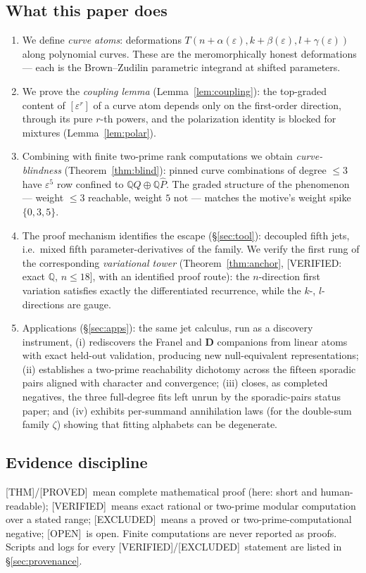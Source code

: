 \documentclass[11pt,reqno]{amsart}
\theoremstyle{plain}
\theoremstyle{definition}
\theoremstyle{remark}
\newcommand{\Q}{\mathbb{Q}}
\newcommand{\Thm}{\textup{\textsf{[THM]}}}
\newcommand{\Proved}{\textup{\textsf{[PROVED]}}}
\newcommand{\Verified}{\textup{\textsf{[VERIFIED]}}}
\newcommand{\VerifiedR}[1]{\textup{\textsf{[VERIFIED: #1]}}}
\newcommand{\Excluded}{\textup{\textsf{[EXCLUDED]}}}
\newcommand{\Open}{\textup{\textsf{[OPEN]}}}
\begin{document}
\subsection{What this paper does}
\begin{enumerate}[leftmargin=2em]
\item We define \emph{curve atoms}: deformations
$T(n+\alpha(\varepsilon),k+\beta(\varepsilon),l+\gamma(\varepsilon))$ along
polynomial curves. These are the meromorphically honest deformations --- each
is the Brown--Zudilin parametric integrand at shifted parameters.
\item We prove the \emph{coupling lemma} (Lemma~\ref{lem:coupling}): the
top-graded content of $[\varepsilon^r]$ of a curve atom depends only on the
first-order direction, through its pure $r$-th powers, and the polarization
identity is blocked for mixtures (Lemma~\ref{lem:polar}).
\item Combining with finite two-prime rank computations we obtain
\emph{curve-blindness} (Theorem~\ref{thm:blind}): pinned curve combinations
of degree $\le3$ have $\varepsilon^5$ row confined to $\Q Q\oplus\Q\hat P$.
The graded structure of the phenomenon --- weight $\le3$ reachable, weight
$5$ not --- matches the motive's weight spike $\{0,3,5\}$.
\item The proof mechanism identifies the escape (§\ref{sec:tool}): decoupled
fifth jets, i.e.\ mixed fifth parameter-derivatives of the family. We verify
the first rung of the corresponding \emph{variational tower}
(Theorem~\ref{thm:anchor}, \VerifiedR{exact $\Q$, $n\le18$}, with an
identified proof route): the $n$-direction first variation satisfies exactly
the differentiated recurrence, while the $k$-, $l$-directions are gauge.
\item Applications (§\ref{sec:apps}): the same jet calculus, run as a
discovery instrument, (i) rediscovers the Franel and $\mathbf D$ companions
from linear atoms with exact held-out validation, producing new
null-equivalent representations; (ii) establishes a two-prime reachability
dichotomy across the fifteen sporadic pairs aligned with character and
convergence; (iii) closes, as completed negatives, the three full-degree
fits left unrun by the sporadic-pairs status paper; and (iv) exhibits
per-summand annihilation laws (for the double-sum family $\zeta$) showing
that fitting alphabets can be degenerate.
\end{enumerate}

\subsection{Evidence discipline}
\Thm/\Proved\ mean complete mathematical proof (here: short and human-readable);
\Verified\ means exact rational or two-prime modular computation over a stated
range; \Excluded\ means a proved or two-prime-computational negative;
\Open\ is open. Finite computations are never reported as proofs. Scripts and
logs for every \Verified/\Excluded\ statement are listed in
§\ref{sec:provenance}.
\end{document}
